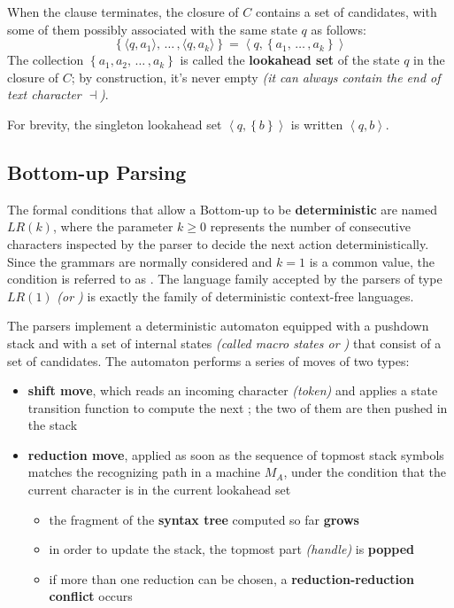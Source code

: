 \documentclass[english]{article}
\begin{document}
When the clause terminates, the closure of \(C\) contains a set of candidates, with some of them possibly associated with the same state \(q\) as follows:
\[ \left\{ \langle q, a_1 \rangle, \,\ldots\, , \langle q, a_k \rangle \right\} = \left\langle q, \left\{ a_1, \,\ldots\, , a_k \right\} \right\rangle \]
The collection \(\left\{ a_1, a_2, \,\ldots\, , a_k \right\}\) is called the \textbf{lookahead set} of the state \(q\) in the closure of \(C\);
by construction, it's never empty \textit{(it can always contain the end of text character \(\dashv\))}.

For brevity, the singleton lookahead set \(\left\langle q, \left\{ b \right\} \right\rangle\) is written \(\left\langle q, b \right\rangle\).

\subsection{Bottom-up Parsing}

The formal conditions that allow a Bottom-up to be \textbf{deterministic} are named \(\textit{LR}(k)\), where the parameter \(k \geq 0\) represents the number of consecutive characters inspected by the parser to decide the next action deterministically.
Since the \EBNF grammars are normally considered and \(k=1\) is a common value, the condition is referred to as \elro.
The language family accepted by the parsers of type \(\textit{LR}(1)\) \textit{(or \elro)} is exactly the family \DET of deterministic context-free languages.

The \elro parsers implement a deterministic automaton equipped with a pushdown stack and with a set of internal states \textit{(called macro states or \mstates)} that consist of a set of candidates.
The automaton performs a series of moves of two types:

\begin{itemize}
  \item \textbf{shift move}, which reads an incoming character \textit{(token)} and applies a state transition function to compute the next \mstate; the two of them are then pushed in the stack
  \item \textbf{reduction move}, applied as soon as the sequence of topmost stack symbols matches the recognizing path in a machine \(M_A\), under the condition that the current character is in the current lookahead set
        \begin{itemize}[label=\(\rightarrow\)]
          \item the fragment of the \textbf{syntax tree} computed so far \textbf{grows}
          \item in order to update the stack, the topmost part \textit{(handle)} is \textbf{popped}
          \item if more than one reduction can be chosen, a \textbf{reduction-reduction conflict} occurs
        \end{itemize}
\end{itemize}
\end{document}

